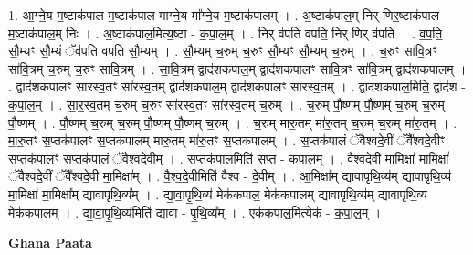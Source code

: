 \documentclass[17pt]{extarticle}
\begin{document}
1. आ॒ग्ने॒य म॒ष्टाक॑पाल म॒ष्टाक॑पाल माग्ने॒य मा᳚ग्ने॒य म॒ष्टाक॑पालम् । . अ॒ष्टाक॑पाल॒म् निर् णिर॒ष्टाक॑पाल म॒ष्टाक॑पाल॒म् निः । . अ॒ष्टाक॑पाल॒मित्य॒ष्टा - क॒पा॒ल॒म् । . निर् व॑पति वपति॒ निर् णिर् व॑पति । . व॒प॒ति॒ सौ॒म्यꣳ सौ॒म्यं ॅव॑पति वपति सौ॒म्यम् । . सौ॒म्यम् च॒रुम् च॒रुꣳ सौ॒म्यꣳ सौ॒म्यम् च॒रुम् । . च॒रुꣳ सा॑वि॒त्रꣳ सा॑वि॒त्रम् च॒रुम् च॒रुꣳ सा॑वि॒त्रम् । . सा॒वि॒त्रम् द्वाद॑शकपाल॒म् द्वाद॑शकपालꣳ सावि॒त्रꣳ सा॑वि॒त्रम् द्वाद॑शकपालम् । . द्वाद॑शकपालꣳ सारस्व॒तꣳ सा॑रस्व॒तम् द्वाद॑शकपाल॒म् द्वाद॑शकपालꣳ सारस्व॒तम् । . द्वाद॑शकपाल॒मिति॒ द्वाद॑श - क॒पा॒ल॒म् । . सा॒र॒स्व॒तम् च॒रुम् च॒रुꣳ सा॑रस्व॒तꣳ सा॑रस्व॒तम् च॒रुम् । . च॒रुम् पौ॒ष्णम् पौ॒ष्णम् च॒रुम् च॒रुम् पौ॒ष्णम् । . पौ॒ष्णम् च॒रुम् च॒रुम् पौ॒ष्णम् पौ॒ष्णम् च॒रुम् । . च॒रुम् मा॑रु॒तम् मा॑रु॒तम् च॒रुम् च॒रुम् मा॑रु॒तम् । . मा॒रु॒तꣳ स॒प्तक॑पालꣳ स॒प्तक॑पालम् मारु॒तम् मा॑रु॒तꣳ स॒प्तक॑पालम् । . स॒प्तक॑पालं ॅवैश्वदे॒वीं ॅवै᳚श्वदे॒वीꣳ स॒प्तक॑पालꣳ स॒प्तक॑पालं ॅवैश्वदे॒वीम् । . स॒प्तक॑पाल॒मिति॑ स॒प्त - क॒पा॒ल॒म् । . वै॒श्व॒दे॒वी मा॒मिक्षा॑ मा॒मिक्षां᳚ ॅवैश्वदे॒वीं ॅवै᳚श्वदे॒वी मा॒मिक्षा᳚म् । . वै॒श्व॒दे॒वीमिति॑ वैश्व - दे॒वीम् । . आ॒मिक्षा᳚म् द्यावापृथि॒व्य॑म् द्यावापृथि॒व्य॑ मा॒मिक्षा॑ मा॒मिक्षा᳚म् द्यावापृथि॒व्य᳚म् । . द्या॒वा॒पृ॒थि॒व्य॑ मेक॑कपाल॒ मेक॑कपालम् द्यावापृथि॒व्य॑म् द्यावापृथि॒व्य॑ मेक॑कपालम् । . द्या॒वा॒पृ॒थि॒व्य॑मिति॑ द्यावा - पृ॒थि॒व्य᳚म् । . एक॑कपाल॒मित्येक॑ - क॒पा॒ल॒म् । \newline

\textbf{Ghana Paata } \newline
\end{document}
